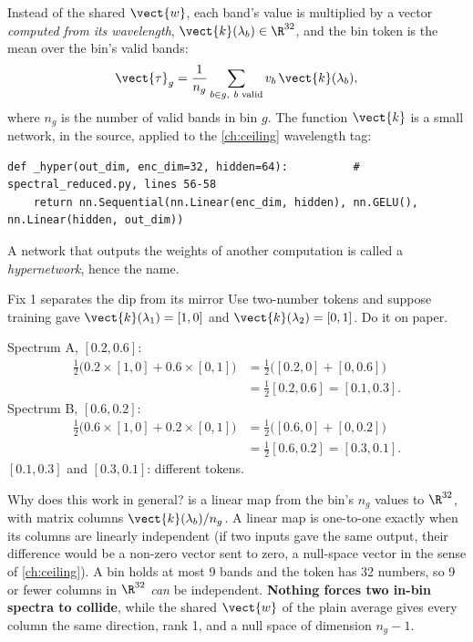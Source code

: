 Instead of the shared $\vect{w}$, each band's value is multiplied by a vector \emph{computed from its wavelength}, $\vect{k}(\lambda_b)\in\R^{32}$, and the bin token is the mean over the bin's valid bands:
\begin{equation}\label{eq:specdecoder:fix1}
  \vect{\tau}_g = \frac{1}{n_g}\sum_{b\in g,\ b\text{ valid}} v_b\,\vect{k}(\lambda_b),
\end{equation}
where $n_g$ is the number of valid bands in bin $g$. The function $\vect{k}$ is a small network,  in the source, applied to the \cref{ch:ceiling} wavelength tag:
\begin{lstlisting}
def _hyper(out_dim, enc_dim=32, hidden=64):          # spectral_reduced.py, lines 56-58
    return nn.Sequential(nn.Linear(enc_dim, hidden), nn.GELU(), nn.Linear(hidden, out_dim))
\end{lstlisting}
A network that outputs the weights of another computation is called a \emph{hypernetwork}, hence the name.

\begin{worked}[label={we:specdecoder:fix1}]{Fix 1 separates the dip from its mirror}
Use two-number tokens and suppose training gave $\vect{k}(\lambda_1) = [1, 0]$ and $\vect{k}(\lambda_2) = [0, 1]$. Do it on paper.

Spectrum A, $[0.2, 0.6]$:
\begin{align*}
  \tfrac{1}{2}\bigl(0.2\times[1, 0] + 0.6\times[0, 1]\bigr) &= \tfrac{1}{2}\bigl([0.2, 0] + [0, 0.6]\bigr)\\
  &= \tfrac{1}{2}[0.2, 0.6] = [0.1, 0.3].
\end{align*}
Spectrum B, $[0.6, 0.2]$:
\begin{align*}
  \tfrac{1}{2}\bigl(0.6\times[1, 0] + 0.2\times[0, 1]\bigr) &= \tfrac{1}{2}\bigl([0.6, 0] + [0, 0.2]\bigr)\\
  &= \tfrac{1}{2}[0.6, 0.2] = [0.3, 0.1].
\end{align*}
$[0.1, 0.3]$ and $[0.3, 0.1]$: different tokens.
\end{worked}

Why does this work in general?  is a linear map from the bin's $n_g$ values to $\R^{32}$, with matrix columns $\vect{k}(\lambda_b)/n_g$. A linear map is one-to-one exactly when its columns are linearly independent (if two inputs gave the same output, their difference would be a non-zero vector sent to zero, a null-space vector in the sense of \cref{ch:ceiling}). A bin holds at most 9 bands and the token has 32 numbers, so 9 or fewer columns in $\R^{32}$ \emph{can} be independent. \textbf{Nothing forces two in-bin spectra to collide}, while the shared $\vect{w}$ of the plain average gives every column the same direction, rank 1, and a null space of dimension $n_g - 1$.

